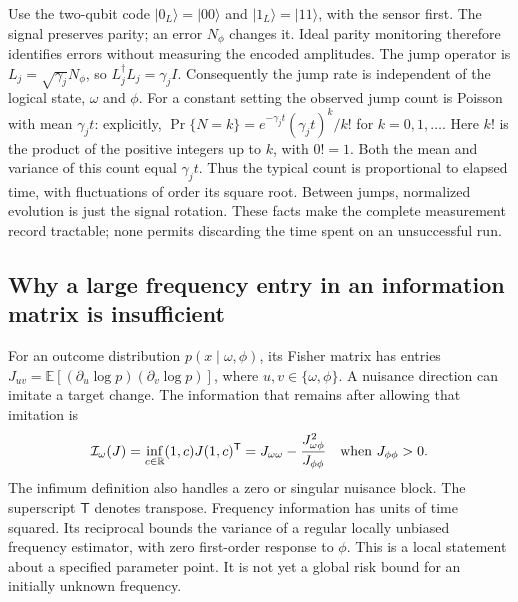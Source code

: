 \documentclass[11pt,a4paper]{article}
\numberwithin{equation}{section}
\theoremstyle{remark}
\begin{document}
Use the two-qubit code $|0_L\rangle=|00\rangle$ and
$|1_L\rangle=|11\rangle$, with the sensor first. The signal preserves parity;
an error $N_\phi$ changes it. Ideal parity monitoring therefore identifies
errors without measuring the encoded amplitudes. The jump operator is
$L_j=\sqrt{\gamma_j}N_\phi$, so $L_j^\dagger L_j=\gamma_j I$.
Consequently the jump rate is independent of the logical state, $\omega$ and
$\phi$. For a constant setting the observed jump count is Poisson with mean
$\gamma_j t$: explicitly,
$\Pr\{N=k\}=e^{-\gamma_jt}(\gamma_jt)^k/k!$ for
$k=0,1,\ldots$. Here $k!$ is the product of the positive integers up to $k$,
with $0!=1$. Both the mean and variance of this count equal $\gamma_jt$.
Thus the typical count is proportional to elapsed time, with fluctuations
of order its square root. Between jumps, normalized evolution is just the signal rotation.
These facts make the complete measurement record tractable; none permits
discarding the time spent on an unsuccessful run.

\subsection{Why a large frequency entry in an information matrix is insufficient}

For an outcome distribution $p(x\mid\omega,\phi)$, its Fisher matrix has entries
$J_{uv}=\mathbb E[(\partial_u\log p)(\partial_v\log p)]$,
where $u,v\in\{\omega,\phi\}$. A nuisance direction can imitate a target
change. The information that remains after allowing that imitation is
\begin{equation}
 \mathcal I_\omega(J)
 =\inf_{c\in\mathbb R}(1,c)J(1,c)^{\mathsf T}
 =J_{\omega\omega}-\frac{J_{\omega\phi}^2}{J_{\phi\phi}}
 \quad\hbox{when }J_{\phi\phi}>0.
 \label{markov:efficient}
\end{equation}
The infimum definition also handles a zero or singular nuisance block. The
superscript $\mathsf T$ denotes transpose. Frequency information has units of
time squared. Its reciprocal bounds the variance of a regular locally unbiased
frequency estimator, with zero first-order response to $\phi$. This is a local
statement about a specified parameter point. It is not yet a global risk bound
for an initially unknown frequency.
\end{document}

